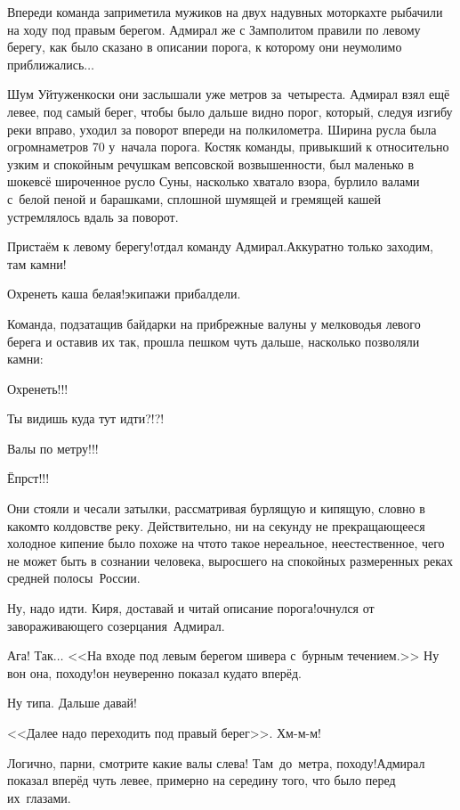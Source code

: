 Впереди команда заприметила мужиков на двух надувных моторках\mdash те рыбачили на ходу под правым берегом. Адмирал же с Замполитом правили по левому берегу, как было сказано в описании порога, к которому они неумолимо приближались$\dots$ 

Шум Уйтуженкоски они заслышали уже метров за~четыреста. Адмирал взял ещё левее, под самый берег, чтобы было дальше видно порог, который, следуя изгибу реки вправо, уходил за поворот впереди на полкилометра. Ширина русла была огромна\mdash метров 70 у~начала порога. Костяк команды, привыкший к относительно узким и спокойным речушкам вепсовской возвышенности, был маленько в шоке\mdash всё широченное русло Суны, насколько хватало взора, бурлило валами с~белой пеной и барашками, сплошной шумящей и гремящей кашей устремлялось вдаль за поворот.

\diagdash Пристаём к левому берегу!\mdash отдал команду Адмирал.\mdash Аккуратно только заходим, там камни!

\diagdash Охренеть каша белая!\mdash экипажи прибалдели.

Команда, подзатащив байдарки на прибрежные валуны у мелководья левого берега и оставив их так, прошла пешком чуть дальше, насколько позволяли камни:

\diagdash Охренеть!!!

\diagdash Ты видишь куда тут идти?!?!

\diagdash Валы по метру!!!

\diagdash Ёпрст!!!

Они стояли и чесали затылки, рассматривая бурлящую и кипящую, словно в каком\sdash то колдовстве реку. Действительно, ни на секунду не прекращающееся холодное кипение было похоже на что\sdash то такое нереальное, неестественное, чего не может быть в сознании человека, выросшего на спокойных размеренных реках средней полосы~России.

\diagdash Ну, надо идти. Киря, доставай и читай описание порога!\mdash очнулся от завораживающего созерцания~Адмирал.

\diagdash Ага! Так$\ldots$ <<На входе под левым берегом шивера с~бурным течением.>> Ну вон она, походу!\mdash он неуверенно показал куда\sdash то вперёд.

\diagdash Ну типа. Дальше давай!

\diagdash <<Далее надо переходить под правый берег>>. Хм-м-м!

\diagdash Логично, парни, смотрите какие валы слева! Там~до~метра, походу!\mdash Адмирал показал вперёд чуть левее, примерно на середину того, что было перед их~глазами.

